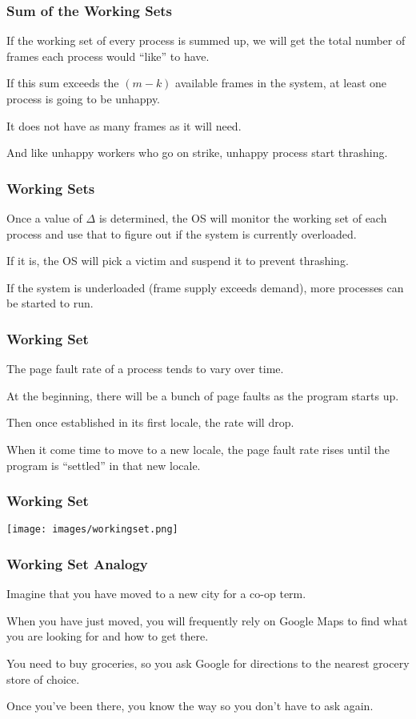 \begin{frame}
\frametitle{Sum of the Working Sets}

If the working set of every process is summed up, we will get the total number of frames each process would ``like'' to have. 

If this sum exceeds the $(m-k)$ available frames in the system, at least one process is going to be unhappy.

It does not have as many frames as it will need. 

And like unhappy workers who go on strike, unhappy process start thrashing.


\end{frame}

\begin{frame}
\frametitle{Working Sets}

Once a value of $\Delta$ is determined, the OS will monitor the working set of each process and use that to figure out if the system is currently overloaded. 

If it is, the OS will pick a victim and suspend it to prevent thrashing. 

If the system is underloaded (frame supply exceeds demand), more processes can be started to run.


\end{frame}

\begin{frame}
\frametitle{Working Set}

The page fault rate of a process tends to vary over time. 

At the beginning, there will be a bunch of page faults as the program starts up. 

Then once established in its first locale, the rate will drop. 

When it come time to move to a new locale, the page fault rate rises until the program is ``settled'' in that new locale.


\end{frame}

\begin{frame}
\frametitle{Working Set}

\begin{center}
	\texttt{[image: images/workingset.png]}
\end{center}


\end{frame}

\begin{frame}
\frametitle{Working Set Analogy}

Imagine that you have moved to a new city for a co-op term. 

When you have just moved, you will frequently rely on Google Maps to find what you are looking for and how to get there. 

You need to buy groceries, so you ask Google for directions to the nearest grocery store of choice. 

Once you've been there, you know the way so you don't have to ask again. 


\end{frame}

